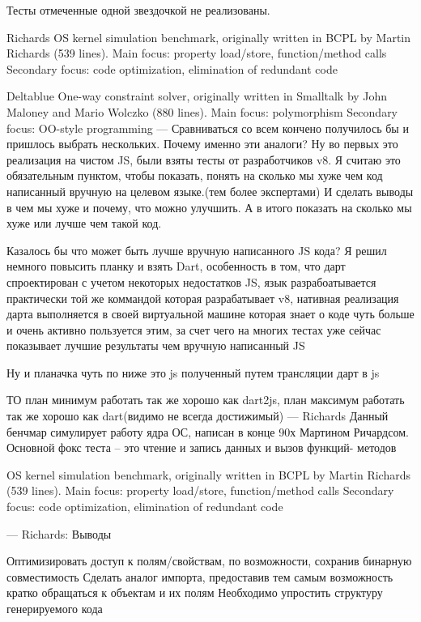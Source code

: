 Тесты отмеченные одной звездочкой не реализованы.

Richards
OS kernel simulation benchmark, originally written in BCPL by Martin Richards (539 lines).
Main focus: property load/store, function/method calls
Secondary focus: code optimization, elimination of redundant code

Deltablue
One-way constraint solver, originally written in Smalltalk by John Maloney and Mario Wolczko (880 lines).
Main focus: polymorphism
Secondary focus: OO-style programming
---
Сравниваться со всем кончено получилось бы и пришлось выбрать нескольких.
Почему именно эти аналоги?
Ну во первых это реализация на чистом JS, были взяты тесты от разработчиков v8. Я считаю это обязательным пунктом, чтобы показать, понять на сколько мы хуже чем код написанный вручную на целевом языке.(тем более экспертами) И сделать выводы в чем мы хуже и почему, что можно улучшить. А в итого показать на сколько мы хуже или лучше чем такой код.

Казалось бы что может быть лучше вручную написанного JS кода? Я решил немного повысить планку и взять Dart, особенность в том, что дарт спроектирован с учетом некоторых недостатков JS, язык разрабоатывается практически той же коммандой которая разрабатывает v8, нативная реализация дарта выполняется в своей виртуальной машине которая знает о коде чуть больше и очень активно пользуется этим, за счет чего на многих тестах уже сейчас показывает лучшие результаты чем вручную написанный JS

Ну и планачка чуть по ниже это js полученный путем трансляции дарт в js

ТО план минимум работать так же хорошо как dart2js, план максимум работать так же хорошо как dart(видимо не всегда достижимый)
---
Richards
Данный бенчмар симулирует работу ядра ОС, написан в конце 90х Мартином Ричардсом.
Основной фокс теста -- это чтение и запись данных и вызов функций- методов

OS kernel simulation benchmark, originally written in BCPL by Martin Richards (539 lines).
Main focus: property load/store, function/method calls
Secondary focus: code optimization, elimination of redundant code

---
Richards: Выводы

Оптимизировать доступ к полям/свойствам, по возможности, сохранив бинарную совместимость
Сделать аналог импорта, предоставив тем самым возможность кратко обращаться к объектам и их полям
Необходимо упростить структуру генерируемого кода

